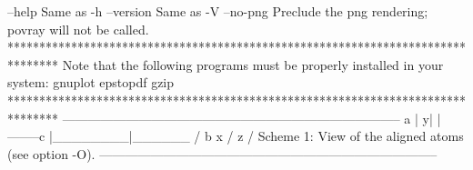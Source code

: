   --help    		Same as -h
  --version 		Same as -V
  --no-png  		Preclude the png rendering; povray will not be called.
********************************************************************************
  Note that the following programs must be properly installed in your system:
                                    gnuplot
                                    epstopdf
                                      gzip
********************************************************************************
--------------------------------------------------------------------------------
            	           a
            	           |
            	          y|
            	           |--------c
            	           |________|______
            	           / b       x       
            	          /
            	       z / 
  Scheme 1: View of the aligned atoms (see option -O).
--------------------------------------------------------------------------------
